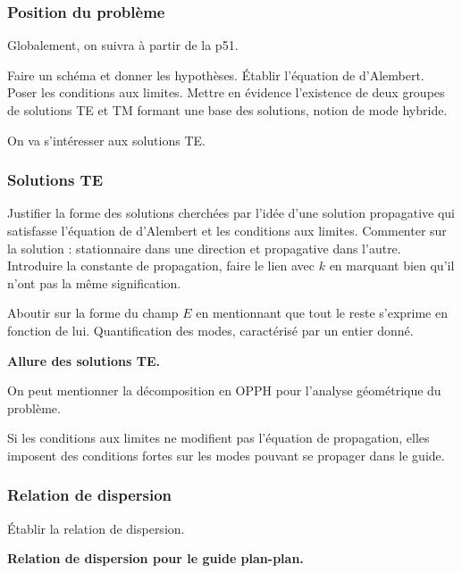\subsubsection{Position du problème}

Globalement, on suivra \cite{Thibierge2014} à partir de la p51.

Faire un schéma et donner les hypothèses.
Établir l'équation de d'Alembert.
Poser les conditions aux limites.
Mettre en évidence l'existence de deux groupes de solutions TE et TM formant une base des solutions, notion de mode hybride.

\begin{transition}
On va s'intéresser aux solutions TE.
\end{transition}

\subsubsection{Solutions TE}

Justifier la forme des solutions cherchées par l'idée d'une solution propagative qui satisfasse l'équation de d'Alembert et les conditions aux limites.
Commenter sur la solution : stationnaire dans une direction et propagative dans l'autre.
Introduire la constante de propagation, faire le lien avec $k$ en marquant bien qu'il n'ont pas la même signification.

Aboutir sur la forme du champ $E$ en mentionnant que tout le reste s'exprime en fonction de lui.
Quantification des modes, caractérisé par un entier donné.

\begin{slide}
\textbf{Allure des solutions TE.}
\end{slide}

On peut mentionner la décomposition en OPPH pour l'analyse géométrique du problème.

\begin{transition}
Si les conditions aux limites ne modifient pas l'équation de propagation, elles imposent des conditions fortes sur les modes pouvant se propager dans le guide.
\end{transition}

\subsubsection{Relation de dispersion}

Établir la relation de dispersion.

\begin{slide}
\textbf{Relation de dispersion pour le guide plan-plan.}
\end{slide}

